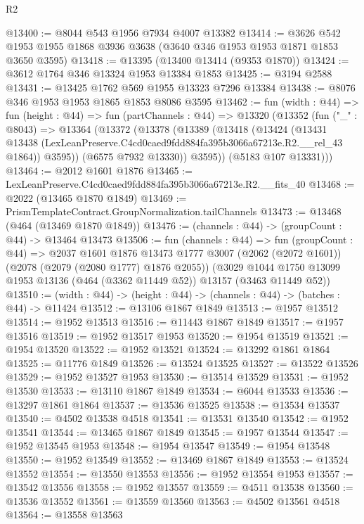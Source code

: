 \begin{lexlean}{R2}
\begin{coremodule}
@13400 := @8044 @543 @1956 @7934 @4007 @13382
@13414 := @3626 @542 @1953 @1955 @1868 @3936 @3638 (@3640 @346 @1953 @1953 @1871 @1853 @3650 @3595)
@13418 := @13395 (@13400 @13414 (@9353 @1870))
@13424 := @3612 @1764 @346 @13324 @1953 @13384 @1853
@13425 := @3194 @2588
@13431 := @13425 @1762 @569 @1955 @13323 @7296 @13384
@13438 := @8076 @346 @1953 @1953 @1865 @1853 @8086 @3595
@13462 := fun (width : @44) =>
  fun (height : @44) =>
  fun (partChannels : @44) =>
  @13320
    (@13352
      (fun ("_" : @8043) =>
      @13364
        (@13372
          (@13378
            (@13389
              (@13418
                (@13424
                  (@13431
                    @13438
                    (LexLeanPreserve.C4cd0caed9fdd884fa395b3066a67213e.R2.__rel_43 @1864))
                  @3595))
              (@6575 @7932 @13330))
            @3595))
        (@5183 @107 @13331)))
@13464 := @2012 @1601 @1876
@13465 := LexLeanPreserve.C4cd0caed9fdd884fa395b3066a67213e.R2.__fits_40
@13468 := @2022 (@13465 @1870 @1849)
@13469 := PrismTemplateContract.GroupNormalization.tailChannels
@13473 := @13468 (@464 (@13469 @1870 @1849))
@13476 := (channels : @44) -> (groupCount : @44) -> @13464 @13473
@13506 := fun (channels : @44) =>
  fun (groupCount : @44) =>
  @2037
    @1601
    @1876
    @13473
    @1777
    @3007
    (@2062 (@2072 @1601))
    (@2078 (@2079 (@2080 @1777) @1876 @2055))
    (@3029 @1044 @1750 @13099 @1953 @13136 (@464 (@3362 @11449 @52)) @13157 (@3463 @11449 @52))
@13510 := (width : @44) -> (height : @44) -> (channels : @44) -> (batches : @44) -> @11424
@13512 := @13106 @1867 @1849
@13513 := @1957 @13512
@13514 := @1952 @13513
@13516 := @11443 @1867 @1849
@13517 := @1957 @13516
@13519 := @1952 @13517 @1953
@13520 := @1954 @13519
@13521 := @1954 @13520
@13522 := @1952 @13521
@13524 := @13292 @1861 @1864
@13525 := @11776 @1849
@13526 := @13524 @13525
@13527 := @13522 @13526
@13529 := @1952 @13527 @1953
@13530 := @13514 @13529
@13531 := @1952 @13530
@13533 := @13110 @1867 @1849
@13534 := @6044 @13533
@13536 := @13297 @1861 @1864
@13537 := @13536 @13525
@13538 := @13534 @13537
@13540 := @4502 @13538 @4518
@13541 := @13531 @13540
@13542 := @1952 @13541
@13544 := @13465 @1867 @1849
@13545 := @1957 @13544
@13547 := @1952 @13545 @1953
@13548 := @1954 @13547
@13549 := @1954 @13548
@13550 := @1952 @13549
@13552 := @13469 @1867 @1849
@13553 := @13524 @13552
@13554 := @13550 @13553
@13556 := @1952 @13554 @1953
@13557 := @13542 @13556
@13558 := @1952 @13557
@13559 := @4511 @13538
@13560 := @13536 @13552
@13561 := @13559 @13560
@13563 := @4502 @13561 @4518
@13564 := @13558 @13563

\end{coremodule}
\end{lexlean}
